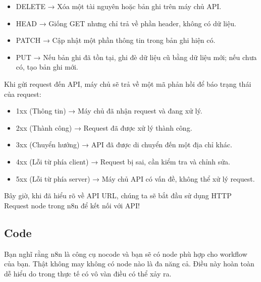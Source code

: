 \begin{enumerate}
\begin{enumerate}
\begin{tcolorbox}[title=Dưới đây là một số phương thức phổ biến:]
\begin{itemize}
    \item DELETE → Xóa một tài nguyên hoặc bản ghi trên máy chủ API.

    \item HEAD → Giống GET nhưng chỉ trả về phần header, không có dữ liệu.

    \item PATCH → Cập nhật một phần thông tin trong bản ghi hiện có.

    \item PUT → Nếu bản ghi đã tồn tại, ghi đè dữ liệu cũ bằng dữ liệu mới; nếu chưa có, tạo bản ghi mới.
\end{itemize}
\end{tcolorbox}




Khi gửi request đến API, máy chủ sẽ trả về một mã phản hồi để báo trạng thái của request:

\begin{tcolorbox}[title=Mã phản hồi HTTP (Response Codes)]
\begin{itemize}
    \item 1xx (Thông tin) → Máy chủ đã nhận request và đang xử lý.

    \item 2xx (Thành công) → Request đã được xử lý thành công.

    \item 3xx (Chuyển hướng) → API đã được di chuyển đến một địa chỉ khác.

    \item 4xx (Lỗi từ phía client) → Request bị sai, cần kiểm tra và chỉnh sửa.

    \item 5xx (Lỗi từ phía server) → Máy chủ API có vấn đề, không thể xử lý request.
\end{itemize}
\end{tcolorbox}

Bây giờ, khi đã hiểu rõ về API URL, chúng ta sẽ bắt đầu sử dụng HTTP Request node trong n8n để kết nối với API! 
\end{enumerate}

\end{enumerate}



\subsection{Code}

Bạn nghĩ rằng n8n là công cụ nocode và bạn sẽ có node phù hợp cho workflow của bạn. Thật không may không có node nào là đa năng cả. Điều này hoàn toàn dễ hiểu do trong thực tế có vô vàn điều có thể xảy ra. 

